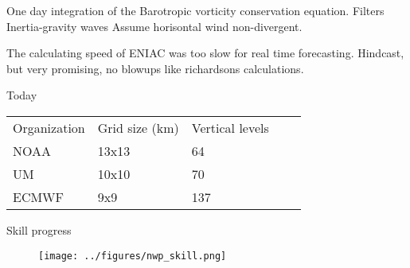 \begin{frame}{}
{One day integration of the Barotropic vorticity conservation equation.
Filters Inertia-gravity waves
Assume horisontal wind non-divergent.

The calculating speed of ENIAC was too slow for real time forecasting.
Hindcast, but very promising, no blowups like richardsons calculations.
}




\end{frame}

\begin{frame}{Today}

  \begin{table}[]
  \begin{tabular}{|l|l|l|ll}
  \cline{1-3}
  Organization & Grid size (km) & Vertical levels &  &  \\ \cline{1-3}
  NOAA         & 13x13          & 64              &  &  \\ \cline{1-3}
  UM           & 10x10          & 70              &  &  \\ \cline{1-3}
  ECMWF        & 9x9            & 137             &  &  \\ \cline{1-3}
  \end{tabular}

  \parencite{nwp}
  \end{table}

\end{frame}




\begin{frame}{Skill progress}
  \begin{figure}[H]
    \centering
    \texttt{[image: ../figures/nwp\_skill.png]}

    \parencite{nwp}
  \end{figure}

\end{frame}

